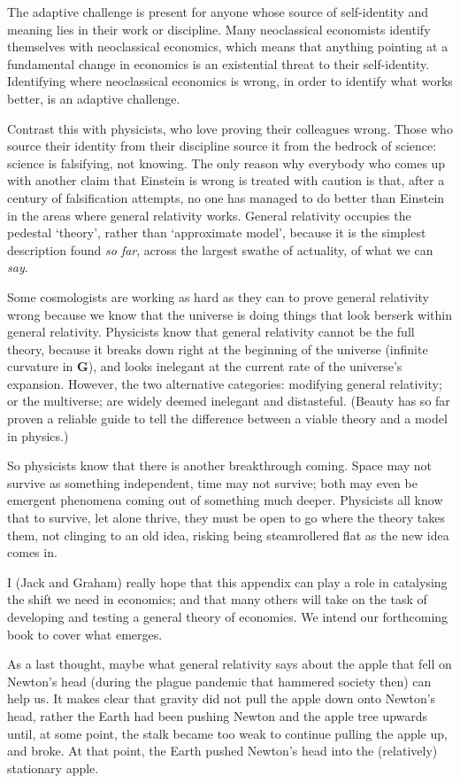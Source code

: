 The adaptive challenge is present for anyone whose source of self\hyp{}identity and meaning lies in their work or discipline. Many neoclassical economists identify themselves with neoclassical economics, which means that anything pointing at a fundamental change in economics is an existential threat to their self\hyp{}identity. Identifying where neoclassical economics is wrong, in order to identify what works better, is an adaptive challenge. 


Contrast this with physicists,  who love proving their colleagues wrong. Those who source their identity from their discipline source it from the bedrock of science: science is falsifying, not knowing. The only reason why everybody who comes up with another claim that Einstein  is wrong is treated with caution is that, after a century of falsification attempts, no one has managed to do better than Einstein in the areas where general relativity works. General relativity  occupies the pedestal ‘theory’, rather than ‘approximate model’, because it is the simplest description found \emph{so far}, across the largest swathe of actuality, of what we can \emph{say}.


Some cosmologists are working as hard as they can to prove general relativity wrong because we know that the universe is doing things that look berserk within general relativity. Physicists know that general relativity cannot be the full theory, because it breaks down right at the beginning of the universe (infinite curvature in $\mathbf{G}$), and looks inelegant at the current rate of the universe’s expansion. However, the two alternative categories: modifying general relativity; or the multiverse; are widely deemed inelegant and distasteful. (Beauty has so far proven a reliable guide to tell the difference between a viable theory and a model in physics.)


So physicists  know that there is another breakthrough coming. Space may not survive as something independent, time may not survive; both may even be emergent phenomena coming out of something much deeper. Physicists  all know that to survive, let alone thrive, they must be open to go where the theory takes them, not clinging to an old idea, risking being steamrollered flat as the new idea comes in.


I (Jack and Graham) really hope that this appendix can play a role in catalysing the shift we need in economics; and that many others will take on the task of developing and testing a general theory of economies. We intend our forthcoming book to cover what emerges. 


As a last thought, maybe what general relativity says about the apple that fell on Newton's head (during the plague pandemic that hammered society then) can help us. It makes clear that gravity did not pull the apple down onto Newton's head, rather the Earth had been pushing Newton  and the apple tree upwards until, at some point, the stalk became too weak to continue pulling the apple up, and broke. At that point, the Earth pushed Newton's head into the (relatively) stationary apple.